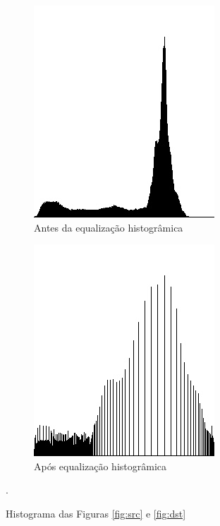 \documentclass[10pt,a4paper]{article}
\begin{document}
\begin{figure}[!ht]
    \centering
    \begin{subfigure}[ht]{0.4\textwidth}
        \includegraphics[width=\textwidth,height=\textwidth]{hist_src.jpg}
        \caption{Antes da equalização histogrâmica}
        \label{fig:hist_src}
    \end{subfigure}
    \qquad
    \begin{subfigure}[ht]{0.4\textwidth}
        \includegraphics[width=\textwidth,height=\textwidth]{hist_dst.jpg}
        \caption{Após equalização histogrâmica}
        \label{fig:hist_dst}
    \end{subfigure}
    \caption{Histograma das Figuras \ref{fig:src} e \ref{fig:dst}}.
\end{figure}
\end{document}
